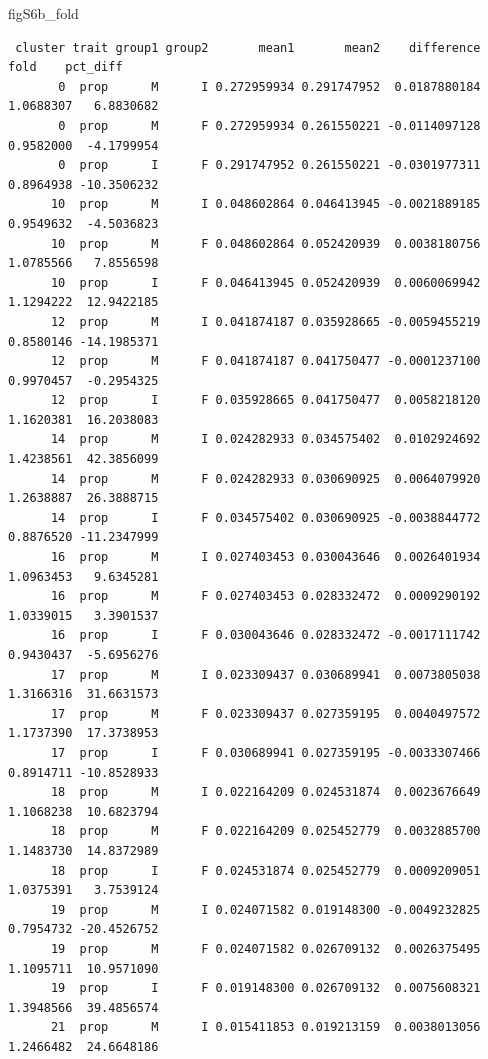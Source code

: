 \documentclass[
  landscape]{article}
\newenvironment{Shaded}{\begin{snugshade}}{\end{snugshade}}
\newcommand{\NormalTok}[1]{#1}
\begin{document}
\begin{Shaded}
\begin{Highlighting}[]
\NormalTok{figS6b\_fold}
\end{Highlighting}
\end{Shaded}

\begin{verbatim}
 cluster trait group1 group2       mean1       mean2    difference      fold    pct_diff
       0  prop      M      I 0.272959934 0.291747952  0.0187880184 1.0688307   6.8830682
       0  prop      M      F 0.272959934 0.261550221 -0.0114097128 0.9582000  -4.1799954
       0  prop      I      F 0.291747952 0.261550221 -0.0301977311 0.8964938 -10.3506232
      10  prop      M      I 0.048602864 0.046413945 -0.0021889185 0.9549632  -4.5036823
      10  prop      M      F 0.048602864 0.052420939  0.0038180756 1.0785566   7.8556598
      10  prop      I      F 0.046413945 0.052420939  0.0060069942 1.1294222  12.9422185
      12  prop      M      I 0.041874187 0.035928665 -0.0059455219 0.8580146 -14.1985371
      12  prop      M      F 0.041874187 0.041750477 -0.0001237100 0.9970457  -0.2954325
      12  prop      I      F 0.035928665 0.041750477  0.0058218120 1.1620381  16.2038083
      14  prop      M      I 0.024282933 0.034575402  0.0102924692 1.4238561  42.3856099
      14  prop      M      F 0.024282933 0.030690925  0.0064079920 1.2638887  26.3888715
      14  prop      I      F 0.034575402 0.030690925 -0.0038844772 0.8876520 -11.2347999
      16  prop      M      I 0.027403453 0.030043646  0.0026401934 1.0963453   9.6345281
      16  prop      M      F 0.027403453 0.028332472  0.0009290192 1.0339015   3.3901537
      16  prop      I      F 0.030043646 0.028332472 -0.0017111742 0.9430437  -5.6956276
      17  prop      M      I 0.023309437 0.030689941  0.0073805038 1.3166316  31.6631573
      17  prop      M      F 0.023309437 0.027359195  0.0040497572 1.1737390  17.3738953
      17  prop      I      F 0.030689941 0.027359195 -0.0033307466 0.8914711 -10.8528933
      18  prop      M      I 0.022164209 0.024531874  0.0023676649 1.1068238  10.6823794
      18  prop      M      F 0.022164209 0.025452779  0.0032885700 1.1483730  14.8372989
      18  prop      I      F 0.024531874 0.025452779  0.0009209051 1.0375391   3.7539124
      19  prop      M      I 0.024071582 0.019148300 -0.0049232825 0.7954732 -20.4526752
      19  prop      M      F 0.024071582 0.026709132  0.0026375495 1.1095711  10.9571090
      19  prop      I      F 0.019148300 0.026709132  0.0075608321 1.3948566  39.4856574
      21  prop      M      I 0.015411853 0.019213159  0.0038013056 1.2466482  24.6648186

\end{verbatim}
\end{document}

